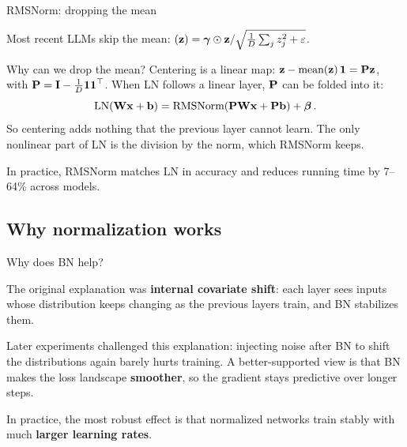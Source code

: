 \documentclass[11pt,aspectratio=169]{beamer}
\begin{document}
\begin{frame}{RMSNorm: dropping the mean}
    \setlength{\parskip}{4pt}\setlength{\abovedisplayskip}{4pt}\setlength{\belowdisplayskip}{4pt}

    Most recent LLMs skip the mean: $(\boldsymbol{\mathbf{z}}) = \boldsymbol{\mathbf{\gamma}} \odot \boldsymbol{\mathbf{z}} / \sqrt{\tfrac{1}{D}\sum_j z_j^2 + \varepsilon}$.

    Why can we drop the mean? Centering is a linear map:
    $\boldsymbol{\mathbf{z}} - \text{mean}(\boldsymbol{\mathbf{z}})\,\boldsymbol{\mathbf{1}} = \boldsymbol{\mathbf{P}}\boldsymbol{\mathbf{z}}$, with
    $\boldsymbol{\mathbf{P}} = \boldsymbol{\mathbf{I}} - \frac{1}{D}\boldsymbol{\mathbf{1}}\boldsymbol{\mathbf{1}}^\top$. When LN follows a linear
    layer, $\boldsymbol{\mathbf{P}}$ can be folded into it:
    \[
        \text{LN}(\boldsymbol{\mathbf{W}}\boldsymbol{\mathbf{x}} + \boldsymbol{\mathbf{b}}) = \text{RMSNorm}(\boldsymbol{\mathbf{P}}\boldsymbol{\mathbf{W}}\boldsymbol{\mathbf{x}} + \boldsymbol{\mathbf{P}}\boldsymbol{\mathbf{b}}) + \boldsymbol{\mathbf{\beta}} \,.
    \]
    So centering adds nothing that the previous layer cannot learn. The only
    nonlinear part of LN is the division by the norm, which RMSNorm keeps.

    \begin{tcolorbox}[nndsgreen]
        In practice, RMSNorm matches LN in accuracy and reduces running time by
        7--64\% across models.
    \end{tcolorbox}


\end{frame}

\subsection{Why normalization works}

\begin{frame}{Why does BN help?}
    \setlength{\parskip}{6pt}

    The original explanation was \textbf{internal covariate shift}: each layer
    sees inputs whose distribution keeps changing as the previous layers train,
    and BN stabilizes them.

    Later experiments challenged this explanation: injecting noise after BN to shift the
    distributions again barely hurts training. A better-supported view is that
    BN makes the loss landscape \textbf{smoother}, so the gradient stays
    predictive over longer steps.

    \begin{tcolorbox}[nndsgreen]
        In practice, the most robust effect is that normalized networks train
        stably with much \textbf{larger learning rates}.
    \end{tcolorbox}


\end{frame}
\end{document}
